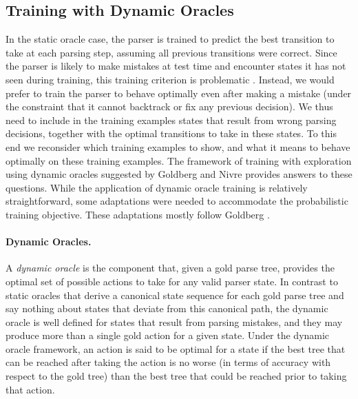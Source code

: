 \documentclass[11pt]{article}
\begin{document}
\subsection{Training with Dynamic Oracles}
\label{dyn-train}
In the static oracle case, the parser is trained to predict the best transition
to take at each parsing step,
assuming all previous transitions were correct.
Since the parser is likely to make mistakes at test time and encounter states
it has not seen during training, this training criterion is problematic \cite[\emph{inter alia}]{daume09,ross11,goldberg12dynamic,goldberg2013training}. Instead, we would prefer to train the parser to behave
optimally even after making a mistake (under the constraint that it
cannot backtrack or fix any previous decision).  We thus need to include in the
training examples states that result from wrong parsing decisions,
together with the optimal transitions to take in these states.
To this end we reconsider which training examples to show, and what it
means to behave optimally on these training examples.
The framework of training with exploration using dynamic oracles suggested by
Goldberg and Nivre  provides
answers to these questions. While the application of dynamic oracle training is
relatively straightforward, some adaptations were needed to accommodate the
probabilistic training objective.  These adaptations mostly follow
Goldberg .


\paragraph{Dynamic Oracles.} A \emph{dynamic oracle} is the component that, given a gold parse tree, 
provides the optimal set of possible actions to take
for any valid parser state.  In contrast to static oracles that derive a
canonical state sequence for each gold parse tree and say nothing about
states that deviate from this canonical path, the dynamic
oracle is well defined for states that result from parsing
mistakes, and they may produce more than a single gold action for a given
state.  Under the dynamic oracle framework, an action is said to be
optimal for a state if the best tree that can be reached after taking the
action is no worse (in terms of accuracy with respect to the gold tree) than the
best tree that could be reached prior to taking that action.
\end{document}
